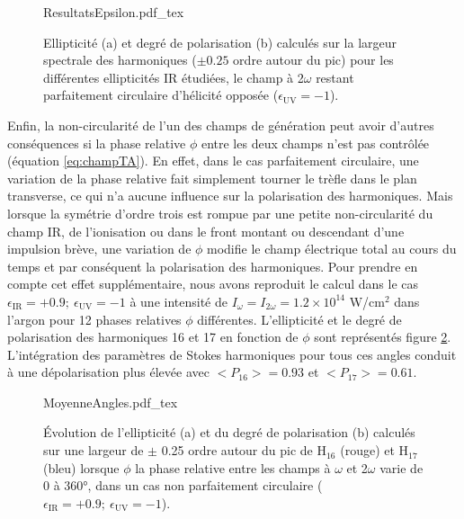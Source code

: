 \begin{figure}
\centering
\def\svgwidth{\textwidth}
{ResultatsEpsilon.pdf_tex}
\caption{Ellipticité (a) et degré de polarisation (b) calculés sur la largeur spectrale des harmoniques ($\pm 0.25$ ordre autour du pic) pour les différentes ellipticités IR étudiées, le champ à 2$\omega$ restant parfaitement circulaire d'hélicité opposée ($\epsilon_{\text{UV}} = -1$).}
\label{fig:ResultatsEpsilon}
\end{figure}

Enfin, la non-circularité de l'un des champs de génération peut avoir d'autres conséquences si la phase relative $\phi$ entre les deux champs n'est pas contrôlée (équation \ref{eq:champTA}). En effet, dans le cas parfaitement circulaire, une variation de la phase relative fait simplement tourner le trèfle dans le plan transverse, ce qui n'a aucune influence sur la polarisation des harmoniques. Mais lorsque la symétrie d'ordre trois est rompue par une petite non-circularité du champ IR, de l'ionisation ou dans le front montant ou descendant d'une impulsion brève, une variation de $\phi$ modifie le champ électrique total au cours du temps et par conséquent la polarisation des harmoniques. Pour prendre en compte cet effet supplémentaire, nous avons reproduit le calcul dans le cas $\epsilon_{\text{IR}} = +0.9 ; \: \epsilon_{\text{UV}} = -1$ à une intensité de $I_\omega = I_{2\omega} = 1.2 \times 10^{14}$ W/cm$^2$ dans l'argon pour 12 phases relatives $\phi$ différentes. L'ellipticité et le degré de polarisation des harmoniques 16 et 17 en fonction de $\phi$ sont représentés figure \ref{fig:MoyenneAngles}. L'intégration des paramètres de Stokes harmoniques pour tous ces angles conduit à une dépolarisation plus élevée avec $<P_{16}> = 0.93$ et $<P_{17}> = 0.61$.

\begin{figure}
\centering
\def\svgwidth{\textwidth}
{MoyenneAngles.pdf_tex}
\caption{\'{E}volution de l'ellipticité (a) et du degré de polarisation (b) calculés sur une largeur de $\pm$ 0.25 ordre autour du pic de H$_{16}$ (rouge) et H$_{17}$ (bleu) lorsque $\phi$ la phase relative entre les champs à $\omega$ et 2$\omega$ varie de 0 à 360°, dans un cas non parfaitement circulaire ($\epsilon_{\text{IR}} = +0.9 ; \: \epsilon_{\text{UV}} = -1$).}
\label{fig:MoyenneAngles}
\end{figure}

